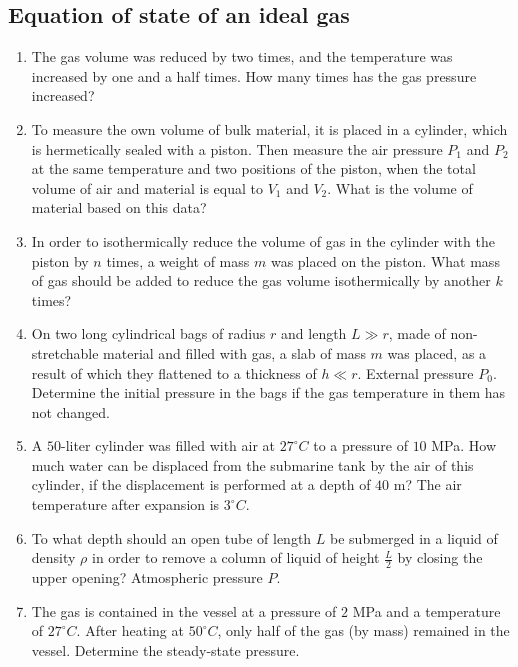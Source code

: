 \documentclass{article}
\begin{document}
\subsection{Equation of state of an ideal gas}

\begin{enumerate}[label=5.5.\arabic*]

\item The gas volume was reduced by two times, and the temperature was increased by one and a half times. How many times has the gas pressure increased?

\item To measure the own volume of bulk material, it is placed in a cylinder, which is hermetically sealed with a piston. Then measure the air pressure $P_1$ and $P_2$ at the same temperature and two positions of the piston, when the total volume of air and material is equal to $V_1$ and $V_2$. What is the volume of material based on this data?

\item In order to isothermically reduce the volume of gas in the cylinder with the piston by $n$ times, a weight of mass $m$ was placed on the piston. What mass of gas should be added to reduce the gas volume isothermically by another $k$ times?

\item On two long cylindrical bags of radius $r$ and length $L \gg r$, made of non-stretchable material and filled with gas, a slab of mass $m$ was placed, as a result of which they flattened to a thickness of $h \ll r$. External pressure $P_0$. Determine the initial pressure in the bags if the gas temperature in them has not changed.



\item A $50$-liter cylinder was filled with air at $27^\circ C$ to a pressure of $10$ MPa. How much water can be displaced from the submarine tank by the air of this cylinder, if the displacement is performed at a depth of $40$ m? The air temperature after expansion is $3^\circ C$.

\item To what depth should an open tube of length $L$ be submerged in a liquid of density $\rho$ in order to remove a column of liquid of height $\frac{L}{2}$ by closing the upper opening? Atmospheric pressure $P$.

\item The gas is contained in the vessel at a pressure of $2$ MPa and a temperature of $27^\circ C$. After heating at $50^\circ C$, only half of the gas (by mass) remained in the vessel. Determine the steady-state pressure.


\end{enumerate}
\end{document}
